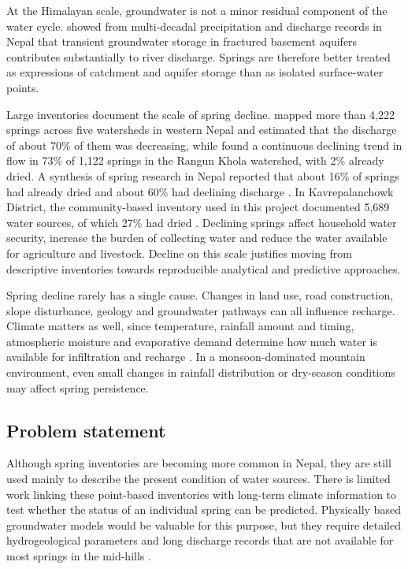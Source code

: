 \documentclass[12pt,a4paper]{article}
\begin{document}
At the Himalayan scale, groundwater is not a minor residual component of the water cycle. \citet{andermann2012} showed from multi-decadal precipitation and discharge records in Nepal that transient groundwater storage in fractured basement aquifers contributes substantially to river discharge. Springs are therefore better treated as expressions of catchment and aquifer storage than as isolated surface-water points.

Large inventories document the scale of spring decline. \citet{adhikari2021} mapped more than 4,222 springs across five watersheds in western Nepal and estimated that the discharge of about 70\% of them was decreasing, while \citet{pandit2024} found a continuous declining trend in flow in 73\% of 1,122 springs in the Rangun Khola watershed, with 2\% already dried. A synthesis of spring research in Nepal reported that about 16\% of springs had already dried and about 60\% had declining discharge \citep{chauhan2023}. In Kavrepalanchowk District, the community-based inventory used in this project documented 5,689 water sources, of which 27\% had dried \citep{pandit2026}. Declining springs affect household water security, increase the burden of collecting water and reduce the water available for agriculture and livestock. Decline on this scale justifies moving from descriptive inventories towards reproducible analytical and predictive approaches.

Spring decline rarely has a single cause. Changes in land use, road construction, slope disturbance, geology and groundwater pathways can all influence recharge. Climate matters as well, since temperature, rainfall amount and timing, atmospheric moisture and evaporative demand determine how much water is available for infiltration and recharge \citep{sharma2019,forsythe2021,nepal2021}. In a monsoon-dominated mountain environment, even small changes in rainfall distribution or dry-season conditions may affect spring persistence.

\subsection{Problem statement}\label{sec:problem}

Although spring inventories are becoming more common in Nepal, they are still used mainly to describe the present condition of water sources. There is limited work linking these point-based inventories with long-term climate information to test whether the status of an individual spring can be predicted. Physically based groundwater models would be valuable for this purpose, but they require detailed hydrogeological parameters and long discharge records that are not available for most springs in the mid-hills \citep{poudel2017}.
\end{document}
